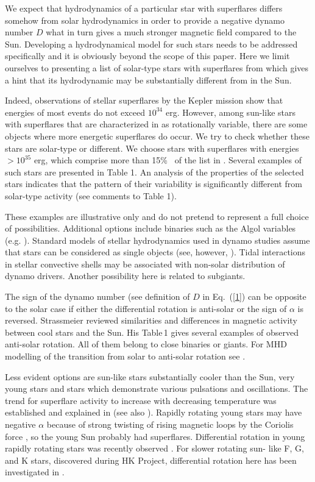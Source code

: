 \documentclass[fleqn,12pt]{SelfArx} %
\begin{document}
We expect that hydrodynamics of a particular star with superflares differs somehow from solar hydrodynamics in 
order to provide a negative dynamo number $D$ what in turn gives a much  stronger magnetic field compared to the 
Sun. Developing a hydrodynamical model for such stars
needs to be addressed specifically and it is obviously beyond the scope of this paper.
Here we limit ourselves to presenting a list of solar-type stars with superflares from \cite{34} which gives a hint 
that its hydrodynamic may be substantially different from in the Sun.

Indeed, observations of stellar superflares by the Kepler mission show that energies of most events do not exceed 
$10^{34}$ erg. 
However, among sun-like stars with superflares that are characterized in \cite{34} as rotationally variable, 
there are some objects where 
 more energetic superflares do occur. 
We try to check whether these stars are solar-type or different. 
We choose stars with superflares with energies $> 10^{35}$ erg, which comprise
 more than 15\%~ of the list in \cite{34}. 
Several examples of such stars are presented in Table 1. 
An analysis of the properties of the selected stars indicates that the pattern of their variability is 
significantly different
 from solar-type activity (see comments to Table 1).

These examples are  illustrative only and do not  pretend to represent a full choice of possibilities.
Additional options include binaries such as the Algol variables (e.g. \cite{39}). Standard models of stellar 
hydrodynamics used in dynamo studies assume that stars can be considered as single objects (see, however, 
\cite{40,41}). Tidal interactions in stellar convective shells may be associated with non-solar distribution of dynamo 
drivers. Another possibility here is related to subgiants.

The sign of the dynamo number (see definition of $D$ in Eq.~(\ref{1})  can be opposite to the solar case if 
either the differential rotation is anti-solar or the sign of $\alpha$ is reversed. Strassmeier \cite{42}  reviewed 
similarities and differences in magnetic activity between cool stars and the Sun. His Table\,1 gives several 
examples of observed anti-solar rotation. All of them belong to close binaries or giants. For MHD modelling of 
the transition from solar to anti-solar rotation see \cite{43}.

Less evident options are sun-like stars substantially cooler than the Sun, very young stars and stars which 
demonstrate various pulsations and oscillations. The trend for superflare activity to increase with decreasing 
temperature was established and explained in \cite{13}  (see also \cite{44}). Rapidly rotating young stars may have
negative $\alpha$ because of strong twisting of rising magnetic loops by the Coriolis force \cite{45}, so the young 
Sun probably had superflares.
Differential rotation in young rapidly rotating stars was recently observed \cite{46,47}.  For slower rotating sun-
like F, G, and K stars, discovered during HK Project, differential rotation here has been  investigated in \cite{48}.
\end{document}
